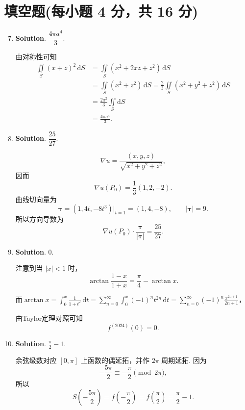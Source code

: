 \documentclass[../Main.tex]{subfiles}
\begin{document}
\section{填空题(每小题 4 分，共 16 分)}
\begin{enumerate}
  \setcounter{enumi}{6}
  \item \textbf{Solution}. $\dfrac{4\pi a^4}{3}$.

        由对称性可知
        \[
          \begin{aligned}
            \iint\limits_{S} (x+z)^2\,\mathrm{d}S & =\iint\limits_{S} (x^2+2xz+z^2)\,\mathrm{d}S                                                      \\
                                                  & =\iint\limits_{S} (x^2+z^2)\,\mathrm{d}S = \frac{2}{3}\iint\limits_{S} (x^2+y^2+z^2)\,\mathrm{d}S \\
                                                  & =\frac{2a^2}{3}\iint\limits_{S} \mathrm{d}S                                                       \\
                                                  & =\frac{4\pi a^4}{3}.
          \end{aligned}
        \]

  \item \textbf{Solution}. $\dfrac{25}{27}$.

        \[
          \nabla u=\frac{(x,y,z)}{\sqrt{x^2+y^2+z^2}},
        \]
        因而
        \[
          \nabla u(P_0)=\frac13(1,2,-2).
        \]
        曲线切向量为
        \[
          \boldsymbol{\tau}=(1,4t,-8t^3)\big|_{t=1}=(1,4,-8),\qquad |\boldsymbol{\tau}|=9.
        \]
        所以方向导数为
        \[
          \nabla u(P_0)\cdot\frac{\boldsymbol{\tau}}{|\boldsymbol{\tau}|}
          =\frac{25}{27}.
        \]

  \item \textbf{Solution}. $0$.

        注意到当 \(|x|<1\) 时，
        \[
          \arctan\frac{1-x}{1+x}=\frac{\pi}{4}-\arctan x.
        \]

        而$\arctan x = \int_{0}^{x}\frac{1}{1+t^2}\,\mathrm{d}t=\sum_{n=0}^{\infty}\int_{0}^{x}(-1)^n t^{2n}\,\mathrm{d}t=\sum_{n=0}^{\infty}(-1)^n \frac{x^{2n+1}}{2n+1}$，

        由Taylor定理对照可知
        \[
          f^{(2024)}(0)=0.
        \]

  \item \textbf{Solution}. $\frac{\pi}{2}-1$.

        余弦级数对应 \([0,\pi]\) 上函数的偶延拓，并作 \(2\pi\) 周期延拓. 因为
        \[
          -\frac{5\pi}{2}\equiv -\frac{\pi}{2}\pmod{2\pi},
        \]
        所以
        \[
          S\left(-\frac{5\pi}{2}\right)=f\left(-\frac{\pi}{2}\right)=f\left(\frac{\pi}{2}\right)=\frac{\pi}{2}-1.
        \]
\end{enumerate}
\end{document}
